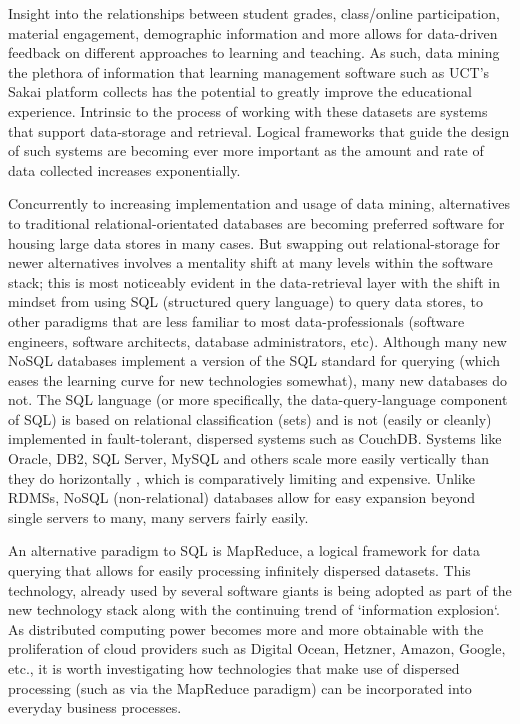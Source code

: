 Insight into the relationships between student grades, class/online participation, material engagement, demographic information and more allows for data-driven feedback on different approaches to learning and teaching. As such, data mining the plethora of information that learning management software such as UCT's Sakai platform collects has the potential to greatly improve the educational experience. Intrinsic to the process of working with these datasets are systems that support data-storage and retrieval. Logical frameworks that guide the design of such systems are becoming ever more important as the amount and rate of data collected increases exponentially.

Concurrently to increasing implementation and usage of data mining, alternatives to traditional relational-orientated databases are becoming preferred software for housing large data stores in many cases. But swapping out relational-storage for newer alternatives involves a mentality shift at many levels within the software stack; this is most noticeably evident in the data-retrieval layer with the shift in mindset from using SQL (structured query language) to query data stores, to other paradigms that are less familiar to most data-professionals (software engineers, software architects, database administrators, etc). Although many new NoSQL databases implement a version of the SQL standard for querying (which eases the learning curve for new technologies somewhat), many new databases do not. The SQL language (or more specifically, the data-query-language component of SQL) is based on relational classification (sets) and is not (easily or cleanly) implemented in fault-tolerant, dispersed systems such as CouchDB. Systems like Oracle, DB2, SQL Server, MySQL and others scale more easily vertically than they do horizontally \cite{couchbaseWhitePaper}, which is comparatively limiting and expensive. Unlike RDMSs, NoSQL (non-relational) databases allow for easy expansion beyond single servers to many, many servers fairly easily.

An alternative paradigm to SQL is MapReduce, a logical framework for data querying that allows for easily processing infinitely dispersed datasets. This technology, already used by several software giants \cite{chandar2010} is being adopted as part of the new technology stack along with the continuing trend of `information explosion`. As distributed computing power becomes more and more obtainable with the proliferation of cloud providers such as Digital Ocean, Hetzner, Amazon, Google, etc., it is worth investigating how technologies that make use of dispersed processing (such as via the MapReduce paradigm) can be incorporated into everyday business processes.

